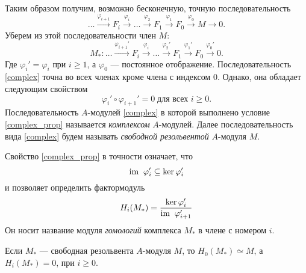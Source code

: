     Таким образом получим, возможно бесконечную, точную последовательность
    \begin{equation*}
        \dots \xrightarrow{\varphi_{i + 1}} F_{i} \xrightarrow{\varphi_{i}} \dots \xrightarrow{\varphi_2} F_1 \xrightarrow{\varphi_1} F_0 \xrightarrow{\varphi_0} M \rightarrow 0.
    \end{equation*}
    Уберем из этой последовательности член $M$:
    \begin{equation}\label{complex}
        M_* : \dots \xrightarrow{\varphi_{i + 1}'} F_{i} \xrightarrow{\varphi_{i}} \dots \xrightarrow{\varphi_2'} F_1 \xrightarrow{\varphi_1'} F_0 \xrightarrow{\varphi_0'} 0. 
    \end{equation}
    Где $\varphi_i' = \varphi_i$ при $i \geqslant 1$, а $\varphi_0$ --- постоянное отображение. Последовательность \eqref{complex} точна во всех членах кроме члена с индексом 0. Однако,
    она обладает следующим свойством 
    \begin{equation}\label{complex_prop}
        \varphi_i' \circ \varphi_{i+1}' = 0\; \text{для всех } i \geqslant 0. 
    \end{equation}
    Последовательность $A$-модулей \eqref{complex} в которой выполнено условие \eqref{complex_prop} называется \textit{комплексом} $A$-модулей. 
    Далее последовательность вида \eqref{complex}
    будем называть \textit{свободной резольвентой} $A$-модуля $M$.

    Свойство \eqref{complex_prop} в точности означает, что 
    $$\textup{im\;}\; \varphi_i' \subseteq \ker \varphi_i'$$
    и позволяет определить фактормодуль 
    \begin{equation} \label{homology}
        H_i(M_*) = \frac{\ker \varphi_i'}{\textup{im\;}\;\varphi_{i+1}'}
    \end{equation}
    Он носит название модуля \textit{гомологий} комплекса $M_*$ в члене с номером $i$.

    Если $M_*$ --- свободная резольвента $A$-модуля $M$, то $H_0(M_*) \simeq M$, а $H_i(M_*) = 0$, при $i \geqslant 0$.


